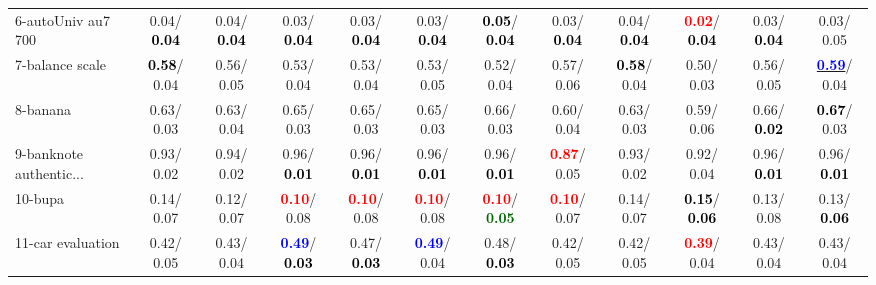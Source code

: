 \begin{table}[h]
\begin{center}
{\begin{tabular}{lc|c|c|c|c|c|c|c|c|c|c}
6-autoUniv au7 700 &   0.04/\textcolor{black}{\textbf{  0.04}} &   0.04/\textcolor{black}{\textbf{  0.04}} &   0.03/\textcolor{black}{\textbf{  0.04}} &   0.03/\textcolor{black}{\textbf{  0.04}} &   0.03/\textcolor{black}{\textbf{  0.04}} & \textcolor{black}{\textbf{  0.05}}/\textcolor{black}{\textbf{  0.04}} &   0.03/\textcolor{black}{\textbf{  0.04}} &   0.04/\textcolor{black}{\textbf{  0.04}} & \textcolor{red}{\textbf{  0.02}}/\textcolor{black}{\textbf{  0.04}} &   0.03/\textcolor{black}{\textbf{  0.04}} &   0.03/  0.05 \\
7-balance scale & \textcolor{black}{\textbf{  0.58}}/  0.04 &   0.56/  0.05 &   0.53/  0.04 &   0.53/  0.04 &   0.53/  0.05 &   0.52/  0.04 &   0.57/  0.06 & \textcolor{black}{\textbf{  0.58}}/  0.04 &   0.50/  0.03 &   0.56/  0.05 & \underline{\textcolor{blue}{\textbf{  0.59}}}/  0.04 \\ \hline
8-banana &   0.63/  0.03 &   0.63/  0.04 &   0.65/  0.03 &   0.65/  0.03 &   0.65/  0.03 &   0.66/  0.03 &   0.60/  0.04 &   0.63/  0.03 &   0.59/  0.06 &   0.66/\textcolor{black}{\textbf{  0.02}} & \textcolor{black}{\textbf{  0.67}}/  0.03 \\
9-banknote authentic... &   0.93/  0.02 &   0.94/  0.02 &   0.96/\textcolor{black}{\textbf{  0.01}} &   0.96/\textcolor{black}{\textbf{  0.01}} &   0.96/\textcolor{black}{\textbf{  0.01}} &   0.96/\textcolor{black}{\textbf{  0.01}} & \textcolor{red}{\textbf{  0.87}}/  0.05 &   0.93/  0.02 &   0.92/  0.04 &   0.96/\textcolor{black}{\textbf{  0.01}} &   0.96/\textcolor{black}{\textbf{  0.01}} \\
10-bupa &   0.14/  0.07 &   0.12/  0.07 & \textcolor{red}{\textbf{  0.10}}/  0.08 & \textcolor{red}{\textbf{  0.10}}/  0.08 & \textcolor{red}{\textbf{  0.10}}/  0.08 & \textcolor{red}{\textbf{  0.10}}/\textcolor{darkgreen}{\textbf{  0.05}} & \textcolor{red}{\textbf{  0.10}}/  0.07 &   0.14/  0.07 & \textcolor{black}{\textbf{  0.15}}/\textcolor{black}{\textbf{  0.06}} &   0.13/  0.08 &   0.13/\textcolor{black}{\textbf{  0.06}} \\
11-car evaluation &   0.42/  0.05 &   0.43/  0.04 & \textcolor{blue}{\textbf{  0.49}}/\textcolor{black}{\textbf{  0.03}} &   0.47/\textcolor{black}{\textbf{  0.03}} & \textcolor{blue}{\textbf{  0.49}}/  0.04 &   0.48/\textcolor{black}{\textbf{  0.03}} &   0.42/  0.05 &   0.42/  0.05 & \textcolor{red}{\textbf{  0.39}}/  0.04 &   0.43/  0.04 &   0.43/  0.04 \\

\end{tabular}}
\end{center}
\end{table}
